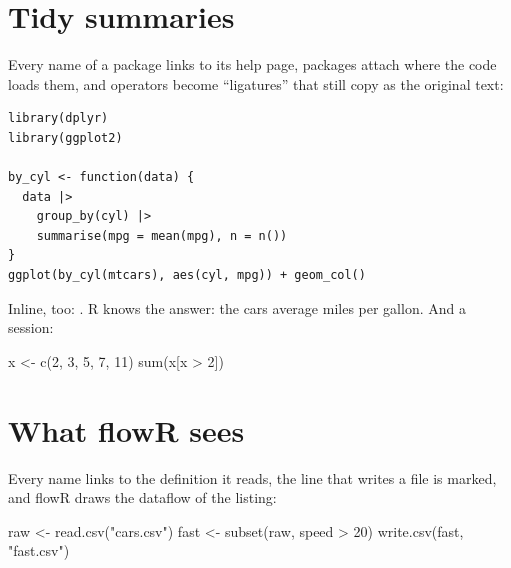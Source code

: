\documentclass{scrartcl}
\begin{document}
\section*{Tidy summaries}
Every name of a package links to its help page, packages attach where the code loads them, and
operators become \enquote{ligatures} that still copy as the original text:
\begin{verbatim}
library(dplyr)
library(ggplot2)

by_cyl <- function(data) {
  data |>
    group_by(cyl) |>
    summarise(mpg = mean(mpg), n = n())
}
ggplot(by_cyl(mtcars), aes(cyl, mpg)) + geom_col()
\end{verbatim}
Inline, too: . R knows the answer: the cars average
 miles per gallon. And a session:
\begin{rsession}
x <- c(2, 3, 5, 7, 11)
sum(x[x > 2])
\end{rsession}
\section*{What flowR sees}
Every name links to the definition it reads, the line that writes a file is marked, and flowR
draws the dataflow of the listing:
\begin{mr}[mrname=clean]
raw <- read.csv("cars.csv")
fast <- subset(raw, speed > 20)
write.csv(fast, "fast.csv")
\end{mr}
\begin{center}
\end{center}
\end{document}
